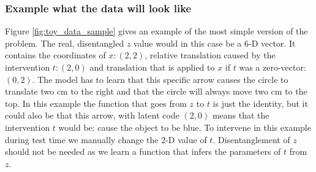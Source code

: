 \documentclass{article}
\begin{document}





\subsubsection*{Example what the data will look like}
 Figure \ref{fig:toy_data_sample} gives an example of the most simple version of the problem. The real, disentangled $z$ value would in this case be a 6-D vector. It contains the coordinates of $x:(2,2)$, relative translation caused by the intervention $t: (2, 0)$ and translation that is applied to $x$ if $t$ was a zero-vector: $(0, 2)$. The model has to learn that this specific arrow causes the circle to translate two cm to the right and that the circle will always move two cm to the top. In this example the function that goes from $z$ to $t$ is just the identity, but it could also be that this arrow, with latent code $(2, 0)$ means that the intervention $t$ would be: cause the object to be blue.  To intervene in this example during test time we manually change the 2-D value of $t$. Disentanglement of $z$ should not be needed as we learn a function that infers the parameters of $t$ from $z$.
\end{document}
